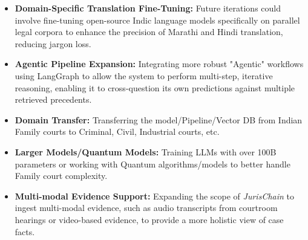 \begin{itemize}
	\item \textbf{Domain-Specific Translation Fine-Tuning:} Future iterations could involve fine-tuning open-source Indic language models specifically on parallel legal corpora to enhance the precision of Marathi and Hindi translation, reducing jargon loss.
	\item \textbf{Agentic Pipeline Expansion:} Integrating more robust "Agentic" workflows using LangGraph to allow the system to perform multi-step, iterative reasoning, enabling it to cross-question its own predictions against multiple retrieved precedents.
	\item \textbf{Domain Transfer:} Transferring the model/Pipeline/Vector DB from Indian Family courts to Criminal, Civil, Industrial courts, etc.
	\item \textbf{Larger Models/Quantum Models:} Training LLMs with over 100B parameters or working with Quantum algorithms/models to better handle Family court complexity.
	\item \textbf{Multi-modal Evidence Support:} Expanding the scope of \textit{JurisChain} to ingest multi-modal evidence, such as audio transcripts from courtroom hearings or video-based evidence, to provide a more holistic view of case facts.
\end{itemize}